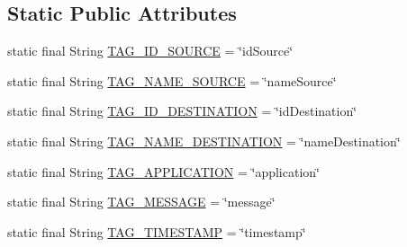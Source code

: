 \subsection*{Static Public Attributes}
\begin{DoxyCompactItemize}
\item 
static final String \hyperlink{classcom_1_1copelabs_1_1oiframework_1_1contentmanager_1_1_packet_a6575deae949b07058159327b71e4c5d5}{T\+A\+G\+\_\+\+I\+D\+\_\+\+S\+O\+U\+R\+C\+E} = \char`\"{}id\+Source\char`\"{}
\item 
static final String \hyperlink{classcom_1_1copelabs_1_1oiframework_1_1contentmanager_1_1_packet_a120803d04db24e48fc40670e344a97f1}{T\+A\+G\+\_\+\+N\+A\+M\+E\+\_\+\+S\+O\+U\+R\+C\+E} = \char`\"{}name\+Source\char`\"{}
\item 
static final String \hyperlink{classcom_1_1copelabs_1_1oiframework_1_1contentmanager_1_1_packet_a1ed7f757f9bc5dc6d0a2d7915c0a8815}{T\+A\+G\+\_\+\+I\+D\+\_\+\+D\+E\+S\+T\+I\+N\+A\+T\+I\+O\+N} = \char`\"{}id\+Destination\char`\"{}
\item 
static final String \hyperlink{classcom_1_1copelabs_1_1oiframework_1_1contentmanager_1_1_packet_a7dad0fcae05780047e9c6c283923c4f5}{T\+A\+G\+\_\+\+N\+A\+M\+E\+\_\+\+D\+E\+S\+T\+I\+N\+A\+T\+I\+O\+N} = \char`\"{}name\+Destination\char`\"{}
\item 
static final String \hyperlink{classcom_1_1copelabs_1_1oiframework_1_1contentmanager_1_1_packet_a31017656446f4aea96409603e2135209}{T\+A\+G\+\_\+\+A\+P\+P\+L\+I\+C\+A\+T\+I\+O\+N} = \char`\"{}application\char`\"{}
\item 
static final String \hyperlink{classcom_1_1copelabs_1_1oiframework_1_1contentmanager_1_1_packet_a8b957cc44760ff9cf75aa5b84de87aa3}{T\+A\+G\+\_\+\+M\+E\+S\+S\+A\+G\+E} = \char`\"{}message\char`\"{}
\item 
static final String \hyperlink{classcom_1_1copelabs_1_1oiframework_1_1contentmanager_1_1_packet_a37f8b33849dc9655b171d2046905e6a2}{T\+A\+G\+\_\+\+T\+I\+M\+E\+S\+T\+A\+M\+P} = \char`\"{}timestamp\char`\"{}
\end{DoxyCompactItemize}

